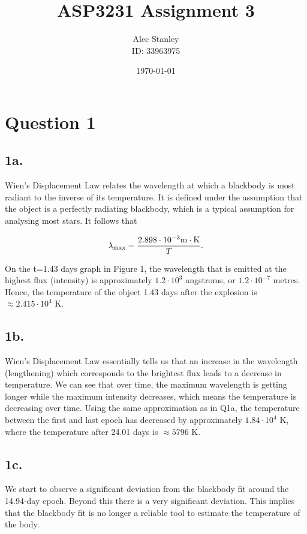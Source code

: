 \documentclass{article}
\title{ASP3231 Assignment 3}
\author{Alec Stanley\\
\vspace{0.1cm}
\small ID: 33963975}
\date{\today}
\begin{document}
\maketitle

\section*{Question 1}

\subsection*{1a.}
Wien's Displacement Law relates the wavelength at which a blackbody is most radiant to the inverse of its temperature. It is defined under the assumption that the object is a perfectly radiating blackbody, which is a typical assumption for analysing most stars. It follows that

\begin{equation}
    \lambda_\textup{max}=\frac{2.898\cdot10^{-3}\textup{m}\cdot\textup{K}}T.
\end{equation}

On the t=1.43 days graph in Figure 1, the wavelength that is emitted at the highest flux (intensity) is approximately $1.2\cdot10^{3}$ angstroms, or $1.2\cdot10^{-7}$ metres. Hence, the temperature of the object 1.43 days after the explosion is $\approx2.415\cdot10^{4}$ K.

\subsection*{1b.}
Wien's Displacement Law essentially tells us that an increase in the wavelength (lengthening) which corresponds to the brightest flux leads to a decrease in temperature. We can see that over time, the maximum wavelength is getting longer while the maximum intensity decreases, which means the temperature is decreasing over time. Using the same approximation as in Q1a, the temperature between the first and last epoch has decreased by approximately $1.84\cdot10^{4}$ K, where the temperature after 24.01 days is $\approx5796$ K.

\subsection*{1c.}
We start to observe a significant deviation from the blackbody fit around the 14.94-day epoch. Beyond this there is a very significant deviation. This implies that the blackbody fit is no longer a reliable tool to estimate the temperature of the body.
\end{document}
